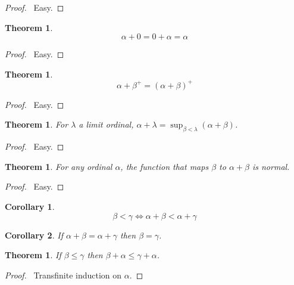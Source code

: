 \documentclass{report}
\let\qed\relax
\newtheorem{theorem}[axiom]{Theorem}
\newtheorem{corollary}{Corollary}[axiom]
\theoremstyle{definition}
\begin{document}
    \begin{proof}
        \pf\ Easy. \qed
    \end{proof}

    \begin{theorem}
        \[ \alpha + 0 = 0 + \alpha = \alpha \]
    \end{theorem}

    \begin{proof}
        \pf\ Easy. \qed
    \end{proof}

    \begin{theorem}
        \[ \alpha + \beta^+ = (\alpha + \beta)^+ \]
    \end{theorem}

    \begin{proof}
        \pf\ Easy. \qed
    \end{proof}

    \begin{theorem}
        For $\lambda$ a limit ordinal, $\alpha + \lambda = \sup_{\beta < \lambda} (\alpha + \beta)$.
    \end{theorem}

    \begin{proof}
        \pf\ Easy. \qed
    \end{proof}

    \begin{theorem}
        For any ordinal $\alpha$, the function that maps $\beta$ to $\alpha + \beta$ is normal.
    \end{theorem}

    \begin{proof}
        \pf\ Easy. \qed
    \end{proof}

    \begin{corollary}
        \[ \beta < \gamma \Leftrightarrow \alpha + \beta < \alpha + \gamma \]
    \end{corollary}

    \begin{corollary}
        If $\alpha + \beta = \alpha + \gamma$ then $\beta = \gamma$.
    \end{corollary}

    \begin{theorem}
        If $\beta \leq \gamma$ then $\beta + \alpha \leq \gamma + \alpha$.
    \end{theorem}

    \begin{proof}
        \pf\ Transfinite induction on $\alpha$. \qed
    \end{proof}
\end{document}
